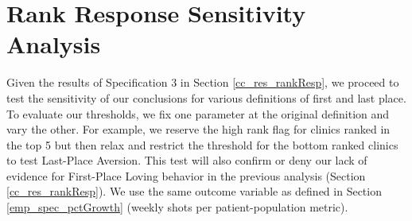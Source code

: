  \begin{table}
 \end{table}

\section{Rank Response Sensitivity Analysis}
Given the results of Specification 3 in Section \ref{cc_res_rankResp}, we proceed to test the sensitivity of our conclusions for various definitions of first and last place. To evaluate our thresholds, we fix one parameter at the original definition and vary the other. For example, we reserve the high rank flag for clinics ranked in the top 5 but then relax and restrict the threshold for the bottom ranked clinics to test Last-Place Aversion. This test will also confirm or deny our lack of evidence for First-Place Loving behavior in the previous analysis (Section \ref{cc_res_rankResp}). We use the same outcome variable as defined in Section \ref{emp_spec_pctGrowth} (weekly shots per patient-population metric).


